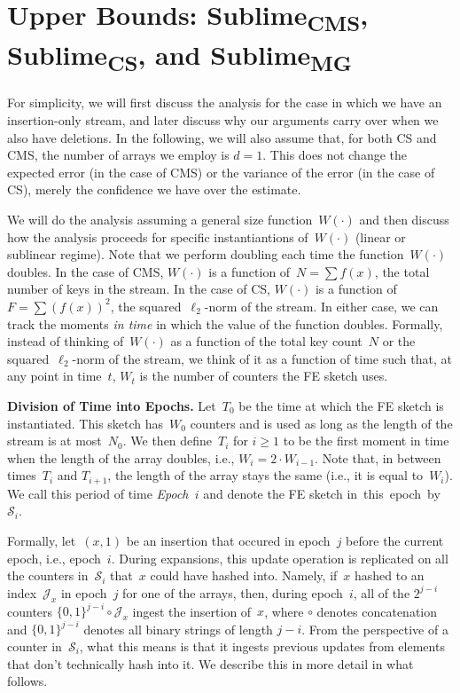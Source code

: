 \documentclass[sigconf]{acmart}
\newcommand{\sketch}{Sublime}
\newcommand{\sketchcms}{\sketch\textsubscript{CMS}\xspace}
\newcommand{\sketchcs}{\sketch\textsubscript{CS}\xspace}
\newcommand{\sketchmg}{\sketch\textsubscript{MG}\xspace}
\begin{document}
\appendix

\section{Upper Bounds: \sketchcms, \sketchcs, and \sketchmg}\label{apx:ommitted_proofs_upper}
For simplicity, we will first discuss the analysis for the case in which we
have an insertion-only stream, and later discuss why our arguments carry over
when we also have deletions. In the following, we will also assume that, for
both CS and CMS, the number of arrays we employ is $d=1$. This does not change
the expected error (in the case of CMS) or the variance of the error (in the
case of CS), merely the confidence we have over the estimate.

We will do the analysis assuming a general size function~$W(\cdot)$ and then
discuss how the analysis proceeds for specific instantiantions of~$W(\cdot)$
(linear or sublinear regime). Note that we perform doubling each time the
function~$W(\cdot)$ doubles. In the case of CMS, $W(\cdot)$ is a function of~$N
= \sum f(x)$, the total number of keys in the stream. In the case of CS,
$W(\cdot)$ is a function of~$F = \sum (f(x))^2$, the
squared~$\ell_2${\nobreakdash-}norm of the stream. In either case, we can track
the moments \emph{in time} in which the value of the function doubles.
Formally, instead of thinking of~$W(\cdot)$ as a function of the total key
count~$N$ or the squared~$\ell_2${\nobreakdash-}norm of the stream, we think of
it as a function of time such that, at any point in time~$t$, $W_t$ is the
number of counters the FE sketch uses.

\medskip
\textbf{Division of Time into Epochs.}
Let~$T_0$ be the time at which the FE sketch is instantiated. This sketch
has~$W_0$ counters and is used as long as the length of the stream is at
most~$N_0$. We then define~$T_i$ for $i\geq 1$ to be the first moment in time
when the length of the array doubles, i.e., $W_i = 2\cdot W_{i-1}$. Note that,
in between times~$T_{i}$ and $T_{i+1}$, the length of the array stays the same
(i.e., it is equal to~$W_i$). We call this period of time \emph{Epoch~$i$} and
denote the FE sketch in~this~epoch~by~$\mathcal{S}_{i}$.

Formally, let~$(x,1)$ be an insertion that occured in epoch~$j$ before the
current epoch, i.e., epoch~$i$. During expansions, this update operation is
replicated on all the counters in~$\mathcal{S}_i$ that~$x$ could have hashed
into. Namely, if~$x$ hashed to an index~$\mathcal{J}_x$ in epoch~$j$ for one of
the arrays, then, during epoch~$i$, all of the $2^{j-i}$ counters
$\{0,1\}^{j-i} \circ \mathcal{J}_x$ ingest the insertion of~$x$, where $\circ$
denotes concatenation and $\{0,1\}^{j-i}$ denotes all binary strings of length
$j-i$. From the perspective of a counter in~$\mathcal{S}_i$, what this means is
that it ingests previous updates from elements that don't technically hash into
it. We describe this in more detail in what follows.
\end{document}
